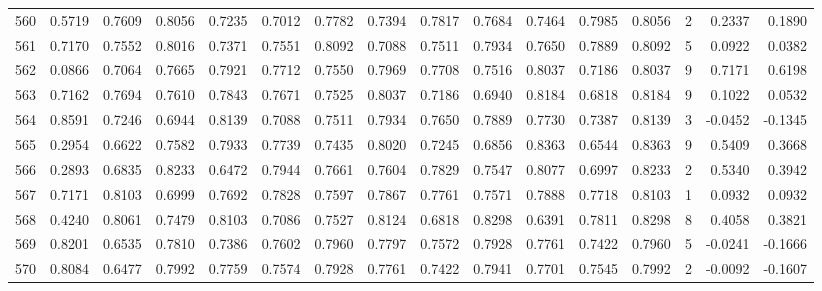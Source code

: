 \begin{tabular}{lrrrrrrrrrrrrrrr}
560 &      0.5719 &  0.7609 &  0.8056 &  0.7235 &  0.7012 &  0.7782 &  0.7394 &  0.7817 &  0.7684 &  0.7464 &   0.7985 &     0.8056 &      2 &                    0.2337 &                     0.1890 \\
561 &      0.7170 &  0.7552 &  0.8016 &  0.7371 &  0.7551 &  0.8092 &  0.7088 &  0.7511 &  0.7934 &  0.7650 &   0.7889 &     0.8092 &      5 &                    0.0922 &                     0.0382 \\
562 &      0.0866 &  0.7064 &  0.7665 &  0.7921 &  0.7712 &  0.7550 &  0.7969 &  0.7708 &  0.7516 &  0.8037 &   0.7186 &     0.8037 &      9 &                    0.7171 &                     0.6198 \\
563 &      0.7162 &  0.7694 &  0.7610 &  0.7843 &  0.7671 &  0.7525 &  0.8037 &  0.7186 &  0.6940 &  0.8184 &   0.6818 &     0.8184 &      9 &                    0.1022 &                     0.0532 \\
564 &      0.8591 &  0.7246 &  0.6944 &  0.8139 &  0.7088 &  0.7511 &  0.7934 &  0.7650 &  0.7889 &  0.7730 &   0.7387 &     0.8139 &      3 &                   -0.0452 &                    -0.1345 \\
565 &      0.2954 &  0.6622 &  0.7582 &  0.7933 &  0.7739 &  0.7435 &  0.8020 &  0.7245 &  0.6856 &  0.8363 &   0.6544 &     0.8363 &      9 &                    0.5409 &                     0.3668 \\
566 &      0.2893 &  0.6835 &  0.8233 &  0.6472 &  0.7944 &  0.7661 &  0.7604 &  0.7829 &  0.7547 &  0.8077 &   0.6997 &     0.8233 &      2 &                    0.5340 &                     0.3942 \\
567 &      0.7171 &  0.8103 &  0.6999 &  0.7692 &  0.7828 &  0.7597 &  0.7867 &  0.7761 &  0.7571 &  0.7888 &   0.7718 &     0.8103 &      1 &                    0.0932 &                     0.0932 \\
568 &      0.4240 &  0.8061 &  0.7479 &  0.8103 &  0.7086 &  0.7527 &  0.8124 &  0.6818 &  0.8298 &  0.6391 &   0.7811 &     0.8298 &      8 &                    0.4058 &                     0.3821 \\
569 &      0.8201 &  0.6535 &  0.7810 &  0.7386 &  0.7602 &  0.7960 &  0.7797 &  0.7572 &  0.7928 &  0.7761 &   0.7422 &     0.7960 &      5 &                   -0.0241 &                    -0.1666 \\
570 &      0.8084 &  0.6477 &  0.7992 &  0.7759 &  0.7574 &  0.7928 &  0.7761 &  0.7422 &  0.7941 &  0.7701 &   0.7545 &     0.7992 &      2 &                   -0.0092 &                    -0.1607 \\

\end{tabular}

